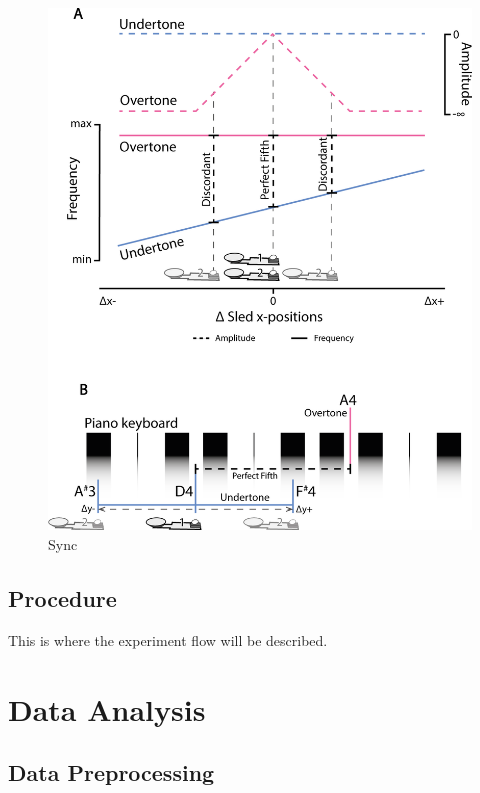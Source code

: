 \documentclass[10pt,a4paper,onecolumn]{article}
\begin{document}
\begin{figure}

{\centering \includegraphics[width=1\linewidth]{figures/sync_sonif_illustration} 

}

\caption{Sync}\label{fig:sync-illustration}
\end{figure}

\hypertarget{procedure}{%
\subsection{Procedure}\label{procedure}}

This is where the experiment flow will be described.

\hypertarget{data-analysis}{%
\section{Data Analysis}\label{data-analysis}}

\hypertarget{data-preprocessing}{%
\subsection{Data Preprocessing}\label{data-preprocessing}}
\end{document}
